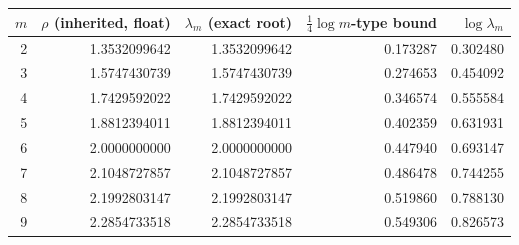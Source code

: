 \begin{tabular}{rrrrr}\toprule $m$ & $\rho$ (inherited, float) & $\lambda_m$ (exact root) & $\tfrac14\log m$-type bound & $\log\lambda_m$\\\midrule
2 & 1.3532099642 & 1.3532099642 & 0.173287 & 0.302480\\
3 & 1.5747430739 & 1.5747430739 & 0.274653 & 0.454092\\
4 & 1.7429592022 & 1.7429592022 & 0.346574 & 0.555584\\
5 & 1.8812394011 & 1.8812394011 & 0.402359 & 0.631931\\
6 & 2.0000000000 & 2.0000000000 & 0.447940 & 0.693147\\
7 & 2.1048727857 & 2.1048727857 & 0.486478 & 0.744255\\
8 & 2.1992803147 & 2.1992803147 & 0.519860 & 0.788130\\
9 & 2.2854733518 & 2.2854733518 & 0.549306 & 0.826573\\
\bottomrule\end{tabular}
